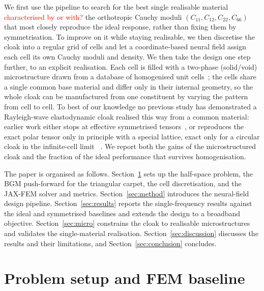 \documentclass[preprint,12pt]{elsarticle}
\begin{document}
We first use the pipeline to search for the best
single realisable material \textcolor{red}{characterised by or with?} the orthotropic Cauchy moduli
$(C_{11},C_{12},C_{22},C_{66})$ that most closely reproduce the ideal
response, rather than fixing them by symmetrisation. To improve on it while
staying realisable, we then discretise the cloak into a regular grid of
cells and let a coordinate-based neural field assign each cell its own
Cauchy moduli and density. We then take the design one step further, to an explicit realisation. Each
cell is filled with a two-phase (solid/void) microstructure drawn from a
database of homogenised unit cells~\citep{nakarmi2024}; the cells share a
single common base material and differ only in their internal geometry, so
the whole cloak can be manufactured from one constituent by varying the
pattern from cell to cell. To best of our knowledge no previous study has
demonstrated a Rayleigh-wave elastodynamic cloak realised this way from a
common material: earlier work either stops at effective symmetrised
tensors~\citep{chatzopoulos2023}, or reproduces the exact polar tensor only
in principle with a special lattice, exact only for a circular cloak 
in the infinite-cell limit ~\citep{nassar2018}. 
We report both the gains of the microstructured cloak and the fraction 
of the ideal performance that survives homogenisation.

The paper is organised as follows. Section~\ref{sec:setup} sets up the
half-space problem, the BGM push-forward for the triangular carpet, the
cell discretisation, and the JAX-FEM solver and metrics.
Section~\ref{sec:method} introduces the neural-field design pipeline.
Section~\ref{sec:results} reports the single-frequency results against the
ideal and symmetrised baselines and extends the
design to a broadband objective. Section~\ref{sec:micro} constrains the
cloak to realisable microstructures and validates the single-material
realisation. Section~\ref{sec:discussion} discusses the results and their
limitations, and Section~\ref{sec:conclusion} concludes.

\section{Problem setup and FEM baseline}\label{sec:setup}
\end{document}
